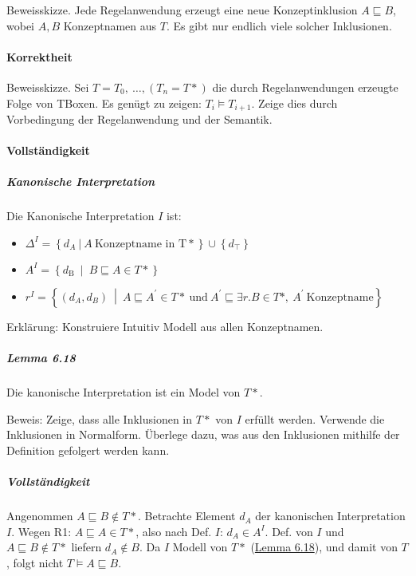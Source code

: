 Beweisskizze. Jede Regelanwendung erzeugt eine neue Konzeptinklusion
$A \sqsubseteq B$, wobei $A,B$ Konzeptnamen aus $T$. Es gibt nur
endlich viele solcher Inklusionen.

\paragraph{Korrektheit}\label{korrektheit-1}

Beweisskizze. Sei $T = T_{0},\ \ldots,(T_{n} = T*)$ die durch
Regelanwendungen erzeugte Folge von TBoxen. Es genügt zu zeigen:
$T_{i} \models T_{i + 1}$. Zeige dies durch Vorbedingung der
Regelanwendung und der Semantik.

\paragraph{Vollständigkeit}\label{vollstuxe4ndigkeit-1}

\subparagraph{Kanonische
Interpretation}\label{kanonische-interpretation}

Die Kanonische Interpretation $I$ ist:

\begin{itemize}
\item
  $\Delta^{I} = \left\{ d_{A}\ |\ A\ \mathrm{\text{Konzeptname\ in\ T}}* \right\} \cup \left\{ d_{\top} \right\}$
\item
  $A^{I} = \left\{ d_{\text{B\ }} \middle| \ B \sqsubseteq A \in T* \right\}$
\item
  $r^{I} = \left\{ \left( d_{A},d_{B} \right)\  \middle| \ A \sqsubseteq A^{'} \in T*\ \mathrm{\text{und}}\ A^{'} \sqsubseteq \exists r.B \in T*,\ A^{'}\ \mathrm{\text{Konzeptname}} \right\}$
\end{itemize}

Erklärung: Konstruiere Intuitiv Modell aus allen Konzeptnamen.

\hypertarget{lemma-6.18}{\subparagraph{Lemma 6.18}\label{lemma-6.18}}

Die kanonische Interpretation ist ein Model von $T*$.

Beweis: Zeige, dass alle Inklusionen in $T*$ von $I$ erfüllt werden.
Verwende die Inklusionen in Normalform. Überlege dazu, was aus den
Inklusionen mithilfe der Definition gefolgert werden kann.

\subparagraph{Vollständigkeit}\label{vollstuxe4ndigkeit-2}

Angenommen $A \sqsubseteq B \notin T*$. Betrachte Element $d_{A}$
der kanonischen Interpretation $I$. Wegen R1:
$A \sqsubseteq A \in T*$, also nach Def. $I$: $d_{A} \in A^{I}$.
Def. von $I$ und $A \sqsubseteq B \notin T*$ liefern
$d_{A} \notin B$. Da $I$ Modell von $T*$
(\protect\hyperlink{lemma-6.18}{Lemma 6.18}), und damit von $T$, folgt
nicht $T \models A \sqsubseteq B$.

